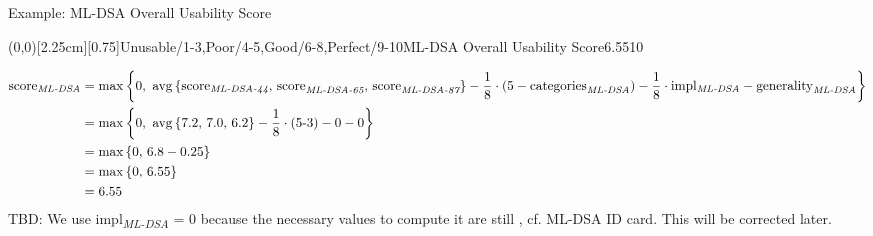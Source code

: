 \begin{algorithmbox}{Example: ML-DSA Overall Usability Score}
	\begin{minipage}[T]{0.25\textwidth}
		\GreenAbsoluteSpeedometer(0,0)[2.25cm][0.75]{Unusable/1-3,Poor/4-5,Good/6-8,Perfect/9-10}{ML-DSA Overall Usability Score}{6.55}{10}{\tiny}{\tiny \montserratsemibold}
	\end{minipage}
	\hfill
	\begin{minipage}[T]{0.75\textwidth}
	\vspace{-\baselineskip}
		\begin{align*}
			\textnormal{score\textsubscript{\itshape ML-DSA}} &= \max\left\{\textnormal{0, }\operatorname{avg}\left\{\textnormal{score}_\textnormal{\itshape ML-DSA-44}\textnormal{, score}_\textnormal{\itshape ML-DSA-65}\textnormal{, score}_\textnormal{\itshape ML-DSA-87}\right\} - \frac{\textnormal{1}}{\textnormal{8}}\cdot\left(\textnormal{5}-\textnormal{categories}_\textnormal{\itshape ML-DSA}\right) - \frac{\textnormal{1}}{\textnormal{8}}\cdot\textnormal{impl\textsubscript{\itshape ML-DSA}}- \textnormal{generality}_\textnormal{\itshape ML-DSA}\right\}\\
			&=\max\left\{\textnormal{0, }\operatorname{avg}\left\{\textnormal{7.2, 7.0, 6.2}\right\} - \frac{\textnormal{1}}{\textnormal{8}}\cdot\left(\textnormal{5-3}\right) - \textnormal{0} - \textnormal{0}\right\}\\
			&=\max\left\{\textnormal{0, }\textnormal{6.8} - \textnormal{0.25}\right\}\\
			&=\max\left\{\textnormal{0, }\textnormal{6.55}\right\}\\
			&=\textnormal{6.55}
		\end{align*}
	\textcolor{themeaccentsecondary}{TBD: We use \textnormal{impl\textsubscript{\itshape ML-DSA}} = 0 because the necessary values to compute it are still \tbd, cf. ML-DSA ID card. This will be corrected later.}\\
	\end{minipage}
\end{algorithmbox}
